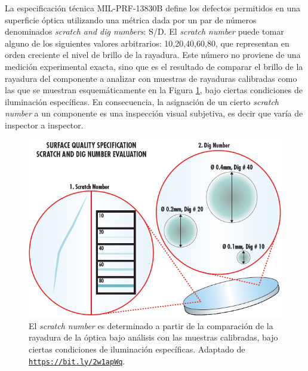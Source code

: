 \hspace{0.5cm}La especificación técnica MIL-PRF-13830B define los defectos permitidos en una superficie óptica utilizando una métrica dada por un par de números denominados \textit{scratch and dig numbers}: S/D. El \textit{scratch number} puede tomar alguno de los siguientes valores arbitrarios: 10,20,40,60,80, que representan en orden creciente el nivel de brillo de la rayadura. Este número no proviene de una medición experimental exacta, sino que es el resultado de comparar el brillo de la rayadura del componente a analizar con muestras de rayaduras calibradas como las que se muestran esquemáticamente en la Figura \ref{fig:scratchanddig}, bajo ciertas condiciones de iluminación específicas. En consecuencia, la asignación de un cierto \textit{scratch number} a un componente es una inspección visual subjetiva, es decir que varía de inspector a inspector.


\begin{figure}[H]
	\centering
	\includegraphics[scale=1.1]{Figs/cuantificaciondefectos/scratchanddig.png}
	\caption{El \textit{scratch number} es determinado a partir de la comparación de la rayadura de la óptica bajo análisis con las muestras calibradas, bajo ciertas condiciones de iluminación específicas. Adaptado de \href{https://bit.ly/2w1apWq}{\texttt{https://bit.ly/2w1apWq}}.}
	\label{fig:scratchanddig}
\end{figure}

